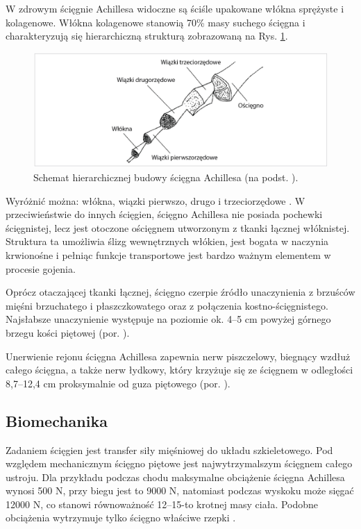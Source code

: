 W zdrowym ścięgnie Achillesa widoczne są ściśle upakowane włókna sprężyste \linebreak i kolagenowe. Włókna kolagenowe stanowią 70\% masy suchego ścięgna i charakteryzują się hierarchiczną strukturą zobrazowaną na Rys. \ref{Achilles-histology}.  
\begin{figure}[h!]
	\centering
	\includegraphics[width=1\textwidth]{figures/Achilles_hist.png}
	\caption{Schemat hierarchicznej budowy ścięgna Achillesa (na podst. \cite{Sharma2006}).}
	\label{Achilles-histology}
\end{figure}

Wyróżnić można: włókna, wiązki pierwszo, drugo i trzeciorzędowe \cite{Sharma2006}. W przeciwieństwie do innych ścięgien, ścięgno Achillesa nie posiada pochewki ścięgnistej, lecz jest otoczone ościęgnem utworzonym z tkanki łącznej włóknistej. Struktura \linebreak ta umożliwia ślizg wewnętrznych włókien, jest bogata w naczynia krwionośne i pełniąc funkcje transportowe jest bardzo ważnym elementem w procesie gojenia. 

Oprócz otaczającej tkanki łącznej, ścięgno czerpie źródło unaczynienia z brzuśców mięśni brzuchatego i płaszczkowatego oraz z połączenia kostno-ścięgnistego. Najsłabsze unaczynienie występuje na poziomie ok. 4--5 cm powyżej górnego brzegu kości piętowej (por. \cite{bochenek2016anatomia}).

Unerwienie rejonu ścięgna Achillesa zapewnia nerw piszczelowy, biegnący wzdłuż całego ścięgna, a także nerw łydkowy, który krzyżuje się ze ścięgnem w odległości 8,7--12,4 cm proksymalnie od guza piętowego (por. \cite{bochenek2016anatomia}). 

\subsection{Biomechanika}
\label{Biomechanika}
Zadaniem ścięgien jest transfer siły mięśniowej do układu szkieletowego. Pod względem mechanicznym ścięgno piętowe jest najwytrzymalszym ścięgnem całego ustroju. Dla przykładu podczas chodu maksymalne obciążenie ścięgna Achillesa wynosi 500 N, przy biegu jest to 9000 N, natomiast podczas wyskoku może sięgać 12000 N, co stanowi równoważność 12--15-to krotnej masy ciała. Podobne obciążenia wytrzymuje tylko ścięgno właściwe rzepki \cite{Etiologia}.

